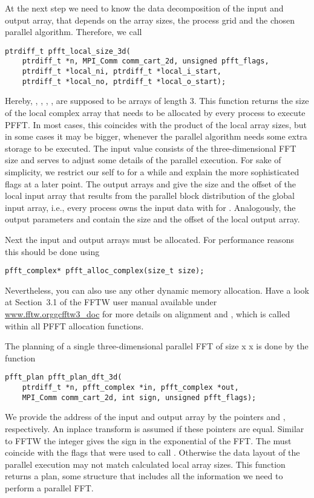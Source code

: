 At the next step we need to know the data decomposition of the input and output array, that depends on
the array sizes, the process grid and the chosen parallel algorithm. Therefore, we call
\begin{lstlisting}
ptrdiff_t pfft_local_size_3d(
    ptrdiff_t *n, MPI_Comm comm_cart_2d, unsigned pfft_flags,
    ptrdiff_t *local_ni, ptrdiff_t *local_i_start,
    ptrdiff_t *local_no, ptrdiff_t *local_o_start);
\end{lstlisting}
Hereby, , , , ,  are supposed
to be arrays of length $3$.
This function returns the size of the local complex array that needs to be allocated by every process to
execute PFFT. In most cases, this coincides with the product of the local array sizes, but in some cases
it may be bigger, whenever the parallel algorithm needs some extra storage to be executed.
The input value  consists of the three-dimensional FFT size and  serves to adjust
some details of the parallel execution. For sake of simplicity, we restrict our self to
 for a while and explain the more sophisticated flags at a later point.
The output arrays  and  give the size and the offset of the local input array
that results from the parallel block distribution of the global input array, i.e.,
every process owns the input data  with 
for . Analogously, the output parameters  and  contain the size
and the offset of the local output array.

Next the input and output arrays must be allocated. For performance reasons this should be done using
\begin{lstlisting}
pfft_complex* pfft_alloc_complex(size_t size);
\end{lstlisting}
Nevertheless, you can also use any other dynamic memory allocation. Have a look at Section~3.1
of the FFTW user manual available under \url{www.fftw.orggcfftw3_doc} for more details on alignment
and , which is called within all PFFT allocation functions.

The planning of a single three-dimensional parallel FFT of size  x  x 
is done by the function
\begin{lstlisting}
pfft_plan pfft_plan_dft_3d(
    ptrdiff_t *n, pfft_complex *in, pfft_complex *out,
    MPI_Comm comm_cart_2d, int sign, unsigned pfft_flags);
\end{lstlisting}
We provide the address of the input and output array by the pointers  and ,
respectively. An inplace transform is assumed if these pointers are equal. 
Similar to FFTW the integer  gives the sign in the exponential of the FFT.
The  must coincide with the flags that were used to call .
Otherwise the data layout of the parallel execution may not match calculated local array sizes.
This function returns a plan, some structure that includes all the information we need to perform a
parallel FFT.

